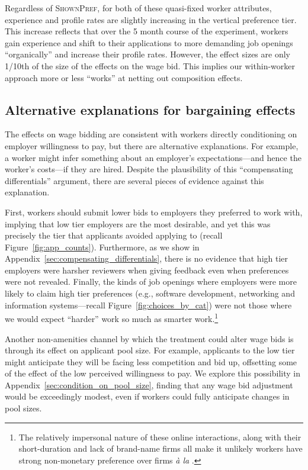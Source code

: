 \documentclass[12pt]{article}
\begin{document}
Regardless of \textsc{ShownPref}, for both of these quasi-fixed worker attributes, experience and profile rates are slightly increasing in the vertical preference tier. 
This increase reflects that over the 5 month course of the experiment, workers gain experience and shift to their applications to more demanding job openings ``organically'' and increase their profile rates.
However, the effect sizes are only 1/10th of the size of the effects on the wage bid.
This implies our within-worker approach more or less ``works'' at netting out composition effects. 

\subsection{Alternative explanations for bargaining effects}
The effects on wage bidding are consistent with workers directly conditioning on employer willingness to pay, but there are alternative explanations. 
For example, a worker  might infer something about an employer's expectations---and hence the worker's costs---if they are hired.
Despite the plausibility of this ``compensating differentials'' argument, there are several pieces of evidence against this explanation.

First, workers should submit lower bids to employers they preferred to work with, implying that low tier employers are the most desirable, and yet this was precisely the tier that applicants avoided applying to (recall Figure~\ref{fig:app_counts}).
Furthermore, as we show in Appendix~\ref{sec:compensating_differentials}, there is no evidence that high tier employers were harsher reviewers when giving feedback even when preferences were not revealed.
Finally, the kinds of job openings where employers were more likely to claim high tier preferences (e.g., software development, networking and information systems---recall Figure~\ref{fig:choices_by_cat}) were not those where we would expect ``harder'' work so much as smarter work.\footnote{
  The relatively impersonal nature of these online interactions, along with their short-duration and lack of brand-name firms all make it unlikely workers have strong non-monetary preference over firms \emph{\`{a} la} \cite{sorkin2018ranking}. 
}

Another non-amenities channel by which the treatment could alter wage bids is through its effect on applicant pool size.
For example, applicants to the low tier might anticipate they will be facing less competition and bid up, offsetting some of the effect of the low perceived willingness to pay. 
We explore this possibility in Appendix~\ref{sec:condition_on_pool_size}, finding that any wage bid adjustment would be exceedingly modest, even if workers could fully anticipate changes in pool sizes. 
\end{document}
